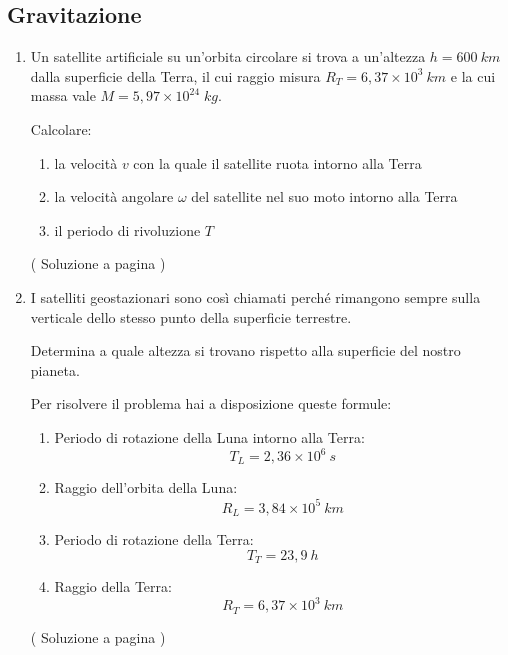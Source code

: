 
\subsection{Gravitazione} \label{gravitazione}


\setcounter{equation}{0}
\begin{enumerate}

\item \label{grav_01}

Un satellite artificiale su un’orbita circolare si trova a un’altezza $h=600\:km$
dalla superficie della Terra, il cui raggio misura $R_T=6,37\times 10^3\: km$
e la cui massa vale $M=5,97\times 10^{24}\; kg$.

Calcolare:

\begin{enumerate}
\item la velocità $v$ con la quale il satellite ruota intorno alla Terra
\item la velocità angolare $\omega$ del satellite nel suo moto intorno alla Terra
\item il periodo di rivoluzione $T$
\end{enumerate}



( Soluzione a pagina \pageref{grav_s_01} )

\item \label{grav_02}

I satelliti geostazionari sono così chiamati perché rimangono sempre sulla verticale dello stesso punto della superficie terrestre.

Determina a quale altezza si trovano rispetto alla superficie del nostro pianeta.

Per risolvere il problema hai a disposizione queste formule:

\begin{enumerate}
\item Periodo di rotazione della Luna intorno alla Terra:
	\[T_L=2,36\times 10^6\:s\]
\item Raggio dell'orbita della Luna:
	\[R_L=3,84\times 10^5\:km\]
\item Periodo di rotazione della Terra:
	\[T_T=23,9\:h\]
\item Raggio della Terra:
	\[R_T=6,37\times 10^3\:km\]
\end{enumerate}

( Soluzione a pagina \pageref{grav_s_02} )


\end{enumerate}


